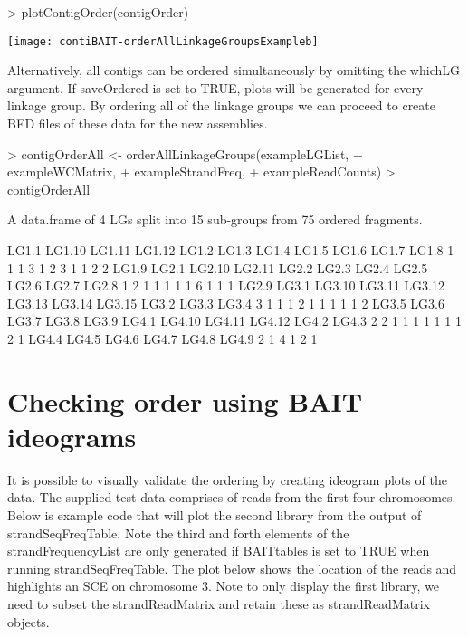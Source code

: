 \documentclass{article}
\begin{document}
\begin{Schunk}
\begin{Sinput}
> plotContigOrder(contigOrder)
\end{Sinput}
\end{Schunk}
\texttt{[image: contiBAIT-orderAllLinkageGroupsExampleb]}

Alternatively, all contigs can be ordered simultaneously by omitting the whichLG argument. If saveOrdered is set to TRUE, plots will be generated for every linkage group.  By ordering all of the linkage groups we can proceed to create BED files of these data for the new assemblies.

\begin{Schunk}
\begin{Sinput}
> contigOrderAll <- orderAllLinkageGroups(exampleLGList,
+ exampleWCMatrix,
+ exampleStrandFreq,
+ exampleReadCounts)
> contigOrderAll
\end{Sinput}
\begin{Soutput}
A data.frame of 4 LGs split into 15 sub-groups from 75 ordered fragments.

 LG1.1 LG1.10 LG1.11 LG1.12  LG1.2  LG1.3  LG1.4  LG1.5  LG1.6  LG1.7  LG1.8 
     1      1      1      3      1      2      3      1      1      2      2 
 LG1.9  LG2.1 LG2.10 LG2.11  LG2.2  LG2.3  LG2.4  LG2.5  LG2.6  LG2.7  LG2.8 
     1      2      1      1      1      1      1      6      1      1      1 
 LG2.9  LG3.1 LG3.10 LG3.11 LG3.12 LG3.13 LG3.14 LG3.15  LG3.2  LG3.3  LG3.4 
     3      1      1      1      2      1      1      1      1      1      2 
 LG3.5  LG3.6  LG3.7  LG3.8  LG3.9  LG4.1 LG4.10 LG4.11 LG4.12  LG4.2  LG4.3 
     2      2      1      1      1      1      1      1      1      2      1 
 LG4.4  LG4.5  LG4.6  LG4.7  LG4.8  LG4.9 
     2      1      4      1      2      1 
\end{Soutput}
\end{Schunk}


\section{Checking order using BAIT ideograms}

It is possible to visually validate the ordering by creating ideogram plots of the data. The supplied test data comprises of reads from the first four chromosomes. Below is example code that will plot the second library from the output of strandSeqFreqTable. Note the third and forth elements of the strandFrequencyList are only generated if BAITtables is set to TRUE when running strandSeqFreqTable.  The plot below shows the location of the reads and highlights an SCE on chromosome 3. Note to only display the first library, we need to subset the strandReadMatrix and retain these as strandReadMatrix objects.
\end{document}
